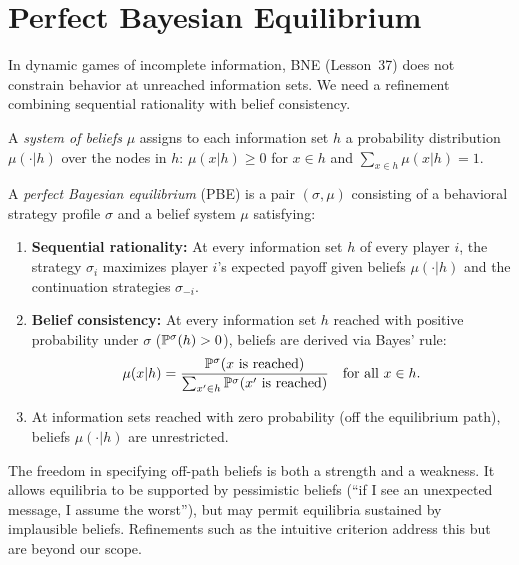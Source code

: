 \documentclass[11pt,a4paper]{article}
\begin{document}

\section{Perfect Bayesian Equilibrium}
\label{sec:beliefs-pbe}

In dynamic games of incomplete information, BNE (Lesson~37) does not
constrain behavior at unreached information sets. We need a refinement
combining sequential rationality with belief consistency.

\begin{definition}
\label{def:beliefs}
A \emph{system of beliefs} $\mu$ assigns to each information set $h$ a
probability distribution $\mu(\cdot|h)$ over the nodes in $h$:
$\mu(x|h) \geq 0$ for $x \in h$ and $\sum_{x \in h}\mu(x|h) = 1$.
\end{definition}

\begin{definition}
\label{def:pbe}
A \emph{perfect Bayesian equilibrium} (PBE) is a pair $(\sigma, \mu)$
consisting of a behavioral strategy profile $\sigma$ and a belief system
$\mu$ satisfying:
\begin{enumerate}[label=(\alph*)]
    \item \textbf{Sequential rationality:} At every information set $h$
    of every player $i$, the strategy $\sigma_i$ maximizes player $i$'s
    expected payoff given beliefs $\mu(\cdot|h)$ and the continuation
    strategies $\sigma_{-i}$.
    \item \textbf{Belief consistency:} At every information set $h$
    reached with positive probability under $\sigma$
    ($\mathbb{P}^\sigma(h) > 0$), beliefs are derived via Bayes' rule:
    \[
        \mu(x|h) = \frac{\mathbb{P}^\sigma(x \text{ is reached})}
        {\sum_{x' \in h}\mathbb{P}^\sigma(x' \text{ is reached})}
        \quad \text{for all } x \in h.
    \]
    \item At information sets reached with zero probability (off the
    equilibrium path), beliefs $\mu(\cdot|h)$ are unrestricted.
\end{enumerate}
\end{definition}

\begin{remark}
The freedom in specifying off-path beliefs is both a strength and a
weakness. It allows equilibria to be supported by pessimistic beliefs
(``if I see an unexpected message, I assume the worst''), but may permit
equilibria sustained by implausible beliefs. Refinements such as the
intuitive criterion address this but are beyond our scope.
\end{remark}
\end{document}
